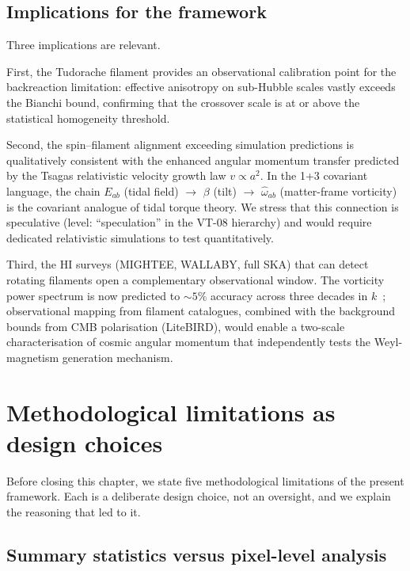 \subsection{Implications for the framework}

Three implications are relevant.

First, the Tudorache filament provides an observational
calibration point for the backreaction limitation: effective
anisotropy on sub-Hubble scales vastly exceeds the Bianchi
bound, confirming that the crossover scale is at or above the
statistical homogeneity threshold.

Second, the spin--filament alignment exceeding simulation
predictions is qualitatively consistent with the enhanced
angular momentum transfer predicted by the Tsagas relativistic
velocity growth law $v \propto a^2$.  In the 1+3 covariant
language, the chain $E_{ab}$ (tidal field) $\to$ $\beta$ (tilt)
$\to$ $\hat{\omega}_{ab}$ (matter-frame vorticity) is the
covariant analogue of tidal torque theory.  We stress that this
connection is speculative (level: ``speculation'' in the VT-08
hierarchy) and would require dedicated relativistic simulations
to test quantitatively.

Third, the HI surveys (MIGHTEE, WALLABY, full SKA) that can
detect rotating filaments open a complementary observational
window.  The vorticity power spectrum is now predicted to
$\sim\!5\%$ accuracy across three decades in
$k$~\cite{Sorensen2025}; observational mapping from filament
catalogues, combined with the background bounds from CMB
polarisation (LiteBIRD), would enable a two-scale
characterisation of cosmic angular momentum that
independently tests the Weyl-magnetism generation mechanism.


\section{Methodological limitations as design choices}
\label{sec:disc-limitations}

Before closing this chapter, we state five methodological
limitations of the present framework.  Each is a deliberate
design choice, not an oversight, and we explain the reasoning
that led to it.


\subsection{Summary statistics versus pixel-level analysis}

